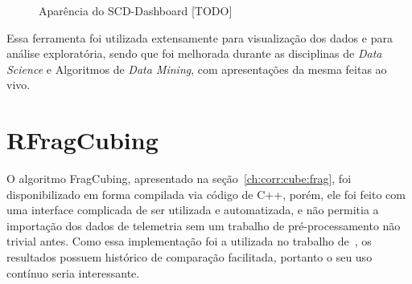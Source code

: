 \begin{figure}[ht]
	\caption{\color{red} Aparência do SCD-Dashboard [TODO]}
	\vspace{6mm}
	\begin{center}
	\end{center}
	\vspace{4mm}
	\legenda{}
	\label{fig:scddashboard}
\end{figure}

Essa ferramenta foi utilizada extensamente para visualização dos dados e para análise exploratória, sendo que foi melhorada durante as disciplinas de \textit{Data Science} e Algoritmos de \textit{Data Mining}, com apresentações da mesma feitas ao vivo.

\section{RFragCubing}
\label{ch:impl:rfrag}

O algoritmo FragCubing, apresentado na seção~\ref{ch:corr:cube:frag}, foi disponibilizado em forma compilada via código de C++, porém, ele foi feito com uma interface complicada de ser utilizada e automatizada, e não permitia a importação dos dados de telemetria sem um trabalho de pré-processamento não trivial antes.
Como essa implementação foi a utilizada no trabalho de~\cite{silva:2015:abordagensParaCubo}, os resultados possuem histórico de comparação facilitada, portanto o seu uso contínuo seria interessante.

